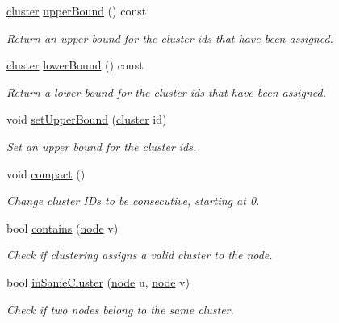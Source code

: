 \begin{DoxyCompactItemize}
\hyperlink{namespace_networ_kit_a189884f50c41226806b31842d2214b71}{cluster} \hyperlink{class_networ_kit_1_1_clustering_a1bf0c38a510c8ef384d2ce25f18e1ab6}{upper\-Bound} () const 
\begin{DoxyCompactList}\small\item\em Return an upper bound for the cluster ids that have been assigned. \end{DoxyCompactList}\item 
\hyperlink{namespace_networ_kit_a189884f50c41226806b31842d2214b71}{cluster} \hyperlink{class_networ_kit_1_1_clustering_aa67805208c7663502ca951801198cb34}{lower\-Bound} () const 
\begin{DoxyCompactList}\small\item\em Return a lower bound for the cluster ids that have been assigned. \end{DoxyCompactList}\item 
void \hyperlink{class_networ_kit_1_1_clustering_a8810a044c480adc30d5e05263dabf67c}{set\-Upper\-Bound} (\hyperlink{namespace_networ_kit_a189884f50c41226806b31842d2214b71}{cluster} id)
\begin{DoxyCompactList}\small\item\em Set an upper bound for the cluster ids. \end{DoxyCompactList}\item 
void \hyperlink{class_networ_kit_1_1_clustering_a549fac681242b49a0864e0e7faba1004}{compact} ()
\begin{DoxyCompactList}\small\item\em Change cluster I\-Ds to be consecutive, starting at 0. \end{DoxyCompactList}\item 
bool \hyperlink{class_networ_kit_1_1_clustering_afe45f9be7aeb735a8560bd5e95324f95}{contains} (\hyperlink{namespace_networ_kit_a53fe3e4fd04ea024160e4d024dfebadf}{node} v)
\begin{DoxyCompactList}\small\item\em Check if clustering assigns a valid cluster to the node. \end{DoxyCompactList}\item 
bool \hyperlink{class_networ_kit_1_1_clustering_aee9b6c2940d730806cd79f5b52c1d87a}{in\-Same\-Cluster} (\hyperlink{namespace_networ_kit_a53fe3e4fd04ea024160e4d024dfebadf}{node} u, \hyperlink{namespace_networ_kit_a53fe3e4fd04ea024160e4d024dfebadf}{node} v)
\begin{DoxyCompactList}\small\item\em Check if two nodes belong to the same cluster. \end{DoxyCompactList}\item 

\end{DoxyCompactItemize}
